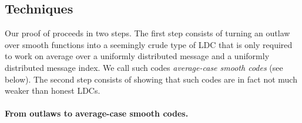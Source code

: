 \documentclass{toc}
\begin{document}
%
\subsection{Techniques}

Our proof of  proceeds in two steps.
The first step consists of turning an outlaw over smooth functions into a seemingly crude type of LDC that is only required to work on average over a uniformly distributed message and a uniformly distributed message index.
We call such codes \emph{average-case smooth codes} (see below).
The second step consists of showing that such codes are in fact not much weaker than honest LDCs. 

\medskip
\paragraph{From outlaws to average-case smooth codes.}
\end{document}
